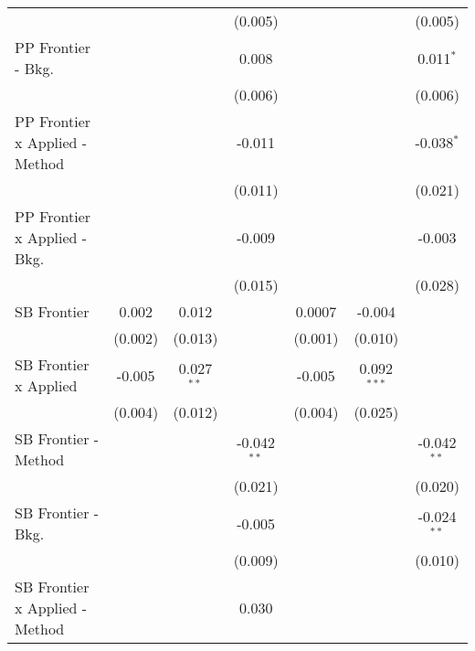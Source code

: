 \begin{tabular}{lcccccc}
                                  &                &              & (0.005)       &                &               & (0.005)\\   
   PP Frontier - Bkg.             &                &              & 0.008         &                &               & 0.011$^{*}$\\   
                                  &                &              & (0.006)       &                &               & (0.006)\\   
   PP Frontier x Applied - Method &                &              & -0.011        &                &               & -0.038$^{*}$\\   
                                  &                &              & (0.011)       &                &               & (0.021)\\   
   PP Frontier x Applied - Bkg.   &                &              & -0.009        &                &               & -0.003\\   
                                  &                &              & (0.015)       &                &               & (0.028)\\   
   SB Frontier                    & 0.002          & 0.012        &               & 0.0007         & -0.004        &   \\   
                                  & (0.002)        & (0.013)      &               & (0.001)        & (0.010)       &   \\   
   SB Frontier x Applied          & -0.005         & 0.027$^{**}$ &               & -0.005         & 0.092$^{***}$ &   \\   
                                  & (0.004)        & (0.012)      &               & (0.004)        & (0.025)       &   \\   
   SB Frontier - Method           &                &              & -0.042$^{**}$ &                &               & -0.042$^{**}$\\   
                                  &                &              & (0.021)       &                &               & (0.020)\\   
   SB Frontier - Bkg.             &                &              & -0.005        &                &               & -0.024$^{**}$\\   
                                  &                &              & (0.009)       &                &               & (0.010)\\   
   SB Frontier x Applied - Method &                &              & 0.030         &                &               &   \\   

\end{tabular}
